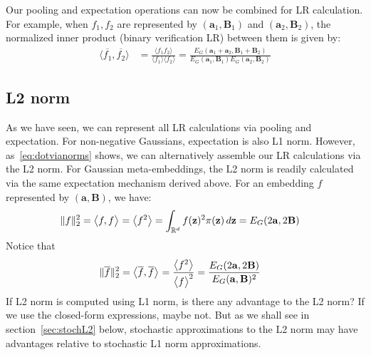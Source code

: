 \documentclass[a4paper,oneside,12pt,english]{report}
\def\zvec{\mathbf{z}}
\def\expv#1#2{\bigl\langle#1\bigr\rangle_{#2}}
\def\expp#1{\bigl\langle#1\bigr\rangle}
\def\R{\mathbb{R}}
\def\Bmat{\mathbf{B}}
\def\Imat{\mathbf{I}}
\def\avec{\mathbf{a}}
\def\dot#1#2{\expv{#1,#2}{}}
\def\normal#1{\overline{#1}}
\def\dotn#1#2{\dot{\normal{#1}}{\normal{#2}}}
\begin{document}
Our pooling and expectation operations can now be combined for LR calculation. For example, when $f_1,f_2$ are represented by $(\avec_1,\Bmat_1)$ and $(\avec_2,\Bmat_2)$, the normalized inner product (binary verification LR) between them is given by:
\begin{align}
\label{eq:LRMVG}
\dotn{f_1}{f_2} &= \frac{\expp{f_1f_2}}{\expp{f_1}\expp{f_2}} = \frac{E_G(\avec_1+\avec_2,\Bmat_1+\Bmat_2)}{E_G(\avec_1,\Bmat_1)E_G(\avec_2,\Bmat_2)}
\end{align}


\subsection{L2 norm}
As we have seen, we can represent all LR calculations via pooling and expectation. For non-negative Gaussians, expectation is also L1 norm.  However, as~\eqref{eq:dotvianorms} shows, we can alternatively assemble our LR calculations via the L2 norm. For Gaussian meta-embeddings, the L2 norm is readily calculated via the same expectation mechanism derived above. For an embedding $f$ represented by $(\avec,\Bmat)$, we have:
\begin{align}
\norm{f}^2 &= \dot{f}{f} = \expp{f^2} = \int_{\R^d}f(\zvec)^2\pi(\zvec)\,d\zvec = E_G(2\avec,2\Bmat)
\end{align}  
Notice that 
\begin{align}
\label{eq:MVG_normalL2}
\norm{\normal{f}}^2 &= \dotn{f}{f} = \frac{\expp{f^2}}{\expp{f}^2} = \frac{E_G(2\avec,2\Bmat)}{E_G(\avec,\Bmat)^2}
\end{align}  
If L2 norm is computed using L1 norm, is there any advantage to the L2 norm? If we use the closed-form expressions, maybe not. But as we shall see in section~\ref{sec:stochL2} below, stochastic approximations to the L2 norm may have advantages relative to stochastic L1 norm approximations.



\end{document}
